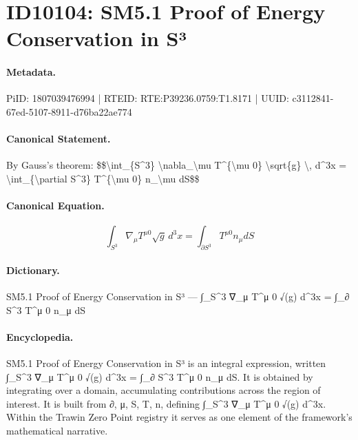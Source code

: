 \section*{ID10104: SM5.1 Proof of Energy Conservation in S³}
\paragraph{Metadata.}
PiID: 1807039476994 | RTEID: RTE:P39236.0759:T1.8171 | UUID: c3112841-67ed-5107-8911-d76ba22ae774

\paragraph{Canonical Statement.}
By Gauss's theorem: \$\$\textbackslash{}int\_\{S\textasciicircum{}3\} \textbackslash{}nabla\_\textbackslash{}mu T\textasciicircum{}\{\textbackslash{}mu 0\} \textbackslash{}sqrt\{g\} \textbackslash{}, d\textasciicircum{}3x = \textbackslash{}int\_\{\textbackslash{}partial S\textasciicircum{}3\} T\textasciicircum{}\{\textbackslash{}mu 0\} n\_\textbackslash{}mu dS\$\$

\paragraph{Canonical Equation.}
\[
\int_{S^3} \nabla_\mu T^{\mu 0} \sqrt{g} \, d^3x = \int_{\partial S^3} T^{\mu 0} n_\mu dS
\]

\paragraph{Dictionary.}
SM5.1 Proof of Energy Conservation in S³ — ∫\_S\textasciicircum{}3 ∇\_μ T\textasciicircum{}μ 0 √(g) d\textasciicircum{}3x = ∫\_∂ S\textasciicircum{}3 T\textasciicircum{}μ 0 n\_μ dS

\paragraph{Encyclopedia.}
SM5.1 Proof of Energy Conservation in S³ is an integral expression, written ∫\_S\textasciicircum{}3 ∇\_μ T\textasciicircum{}μ 0 √(g) d\textasciicircum{}3x = ∫\_∂ S\textasciicircum{}3 T\textasciicircum{}μ 0 n\_μ dS. It is obtained by integrating over a domain, accumulating contributions across the region of interest. It is built from ∂, μ, S, T, n, defining ∫\_S\textasciicircum{}3 ∇\_μ T\textasciicircum{}μ 0 √(g) d\textasciicircum{}3x. Within the Trawin Zero Point registry it serves as one element of the framework's mathematical narrative.
